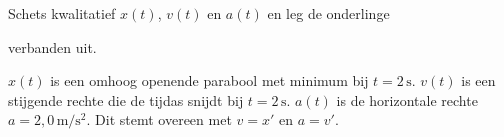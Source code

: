 \documentclass{ximera}
\begin{document}
\begin{oefening}{\oefU\ESS}
\begin{question}
\end{question}

\begin{question}

Schets kwalitatief $x(t)$, $v(t)$ en $a(t)$ en leg de onderlinge

verbanden uit.

\begin{oplossing}
\(x(t)\) is een omhoog openende parabool met minimum bij \(t=2\,\mathrm{s}\). \(v(t)\) is een stijgende rechte die de tijdas snijdt bij \(t=2\,\mathrm{s}\). \(a(t)\) is de horizontale rechte \(a=2,0\,\mathrm{m/s^2}\). Dit stemt overeen met \(v=x'\) en \(a=v'\).
\end{oplossing}

\end{question}

\end{oefening}
\end{document}
